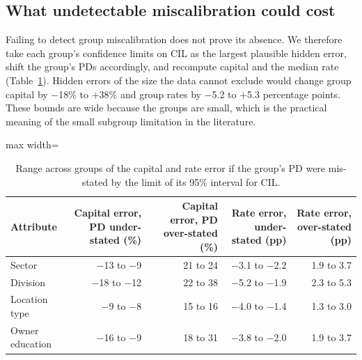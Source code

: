 \documentclass[11pt,a4paper]{article}
\newcommand{\tabsize}{\footnotesize}
\begin{document}
\subsection{What undetectable miscalibration could cost}
Failing to detect group miscalibration does not prove its absence. We therefore take each group's confidence limits on CIL as the largest plausible hidden error, shift the group's PDs accordingly, and recompute capital and the median rate (Table~\ref{tab:bound}). Hidden errors of the size the data cannot exclude would change group capital by $-$18\% to +38\% and group rates by $-$5.2 to +5.3 percentage points. These bounds are wide because the groups are small, which is the practical meaning of the small subgroup limitation in the literature.
\begin{table}[H]\centering\tabsize\caption{Range across groups of the capital and rate error if the group's PD were mis-stated by the limit of its 95\% interval for CIL.}\label{tab:bound}
\begin{adjustbox}{max width=\textwidth}
\begin{tabular}{lrrrr}
\toprule
Attribute & Capital error, PD under-stated (\%) & Capital error, PD over-stated (\%) & Rate error, under-stated (pp) & Rate error, over-stated (pp) \\
\midrule
Sector & $-$13 to $-$9 & 21 to 24 & $-$3.1 to $-$2.2 & 1.9 to 3.7 \\
Division & $-$18 to $-$12 & 22 to 38 & $-$5.2 to $-$1.9 & 2.3 to 5.3 \\
Location type & $-$9 to $-$8 & 15 to 16 & $-$4.0 to $-$1.4 & 1.3 to 3.0 \\
Owner education & $-$16 to $-$9 & 18 to 31 & $-$3.8 to $-$2.0 & 1.9 to 3.7 \\
\bottomrule
\end{tabular}
\end{adjustbox}\end{table}
\end{document}
